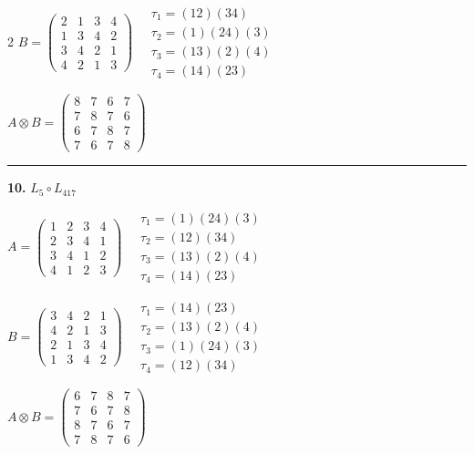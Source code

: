 \begin{multicols}{2}
$B = \begin{pmatrix} 2 & 1 & 3 & 4 \\ 1 & 3 & 4 & 2 \\ 3 & 4 & 2 & 1 \\ 4 & 2 & 1 & 3 \end{pmatrix} \quad \begin{matrix} \tau_{1}=(1 2)(3 4) \\ \tau_{2}=(1)(2 4)(3) \\ \tau_{3}=(1 3)(2)(4) \\ \tau_{4}=(1 4)(2 3) \end{matrix}$

$A \otimes B = \begin{pmatrix} 8 & 7 & 6 & 7 \\ 7 & 8 & 7 & 6 \\ 6 & 7 & 8 & 7 \\ 7 & 6 & 7 & 8 \end{pmatrix}$

\vspace{0.3em}
\hrule
\vspace{0.3em}

\noindent\textbf{10.} $L_{5} \circ L_{417}$

$A = \begin{pmatrix} 1 & 2 & 3 & 4 \\ 2 & 3 & 4 & 1 \\ 3 & 4 & 1 & 2 \\ 4 & 1 & 2 & 3 \end{pmatrix} \quad \begin{matrix} \tau_{1}=(1)(2 4)(3) \\ \tau_{2}=(1 2)(3 4) \\ \tau_{3}=(1 3)(2)(4) \\ \tau_{4}=(1 4)(2 3) \end{matrix}$

$B = \begin{pmatrix} 3 & 4 & 2 & 1 \\ 4 & 2 & 1 & 3 \\ 2 & 1 & 3 & 4 \\ 1 & 3 & 4 & 2 \end{pmatrix} \quad \begin{matrix} \tau_{1}=(1 4)(2 3) \\ \tau_{2}=(1 3)(2)(4) \\ \tau_{3}=(1)(2 4)(3) \\ \tau_{4}=(1 2)(3 4) \end{matrix}$

$A \otimes B = \begin{pmatrix} 6 & 7 & 8 & 7 \\ 7 & 6 & 7 & 8 \\ 8 & 7 & 6 & 7 \\ 7 & 8 & 7 & 6 \end{pmatrix}$


\end{multicols}
